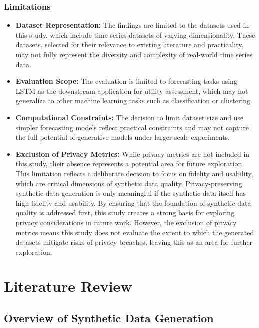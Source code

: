 \documentclass[11pt]{article}
\begin{document}
\subsubsection{Limitations}
\begin{itemize}
    \item \textbf{Dataset Representation:} The findings are limited to the datasets used in this study, which include time series datasets of varying dimensionality.  These datasets, selected for their relevance to existing literature and practicality, may not fully represent the diversity and complexity of real-world time series data.

    \item \textbf{Evaluation Scope:} The evaluation is limited to forecasting tasks using LSTM as the downstream application for utility assessment, which may not generalize to other machine learning tasks such as classification or clustering.
    
    \item \textbf{Computational Constraints:} The decision to limit dataset size and use simpler forecasting models reflect practical constraints and may not capture the full potential of generative models under larger-scale experiments.

    \item \textbf{Exclusion of Privacy Metrics: } While privacy metrics are not included in this study, their absence represents a potential area for future exploration. This limitation reflects a deliberate decision to focus on fidelity and usability, which are critical dimensions of synthetic data quality. Privacy-preserving synthetic data generation is only meaningful if the synthetic data itself has high fidelity and usability. By ensuring that the foundation of synthetic data quality is addressed first, this study creates a strong basis for exploring privacy considerations in future work. However, the exclusion of privacy metrics means this study does not evaluate the extent to which the generated datasets mitigate risks of privacy breaches, leaving this as an area for further exploration.

\end{itemize}


\newpage
\section{Literature Review}

\subsection{Overview of Synthetic Data Generation}
\end{document}
